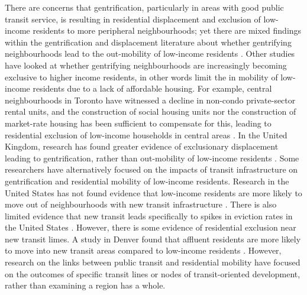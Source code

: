 There are concerns that gentrification, particularly in areas with good public transit service, is resulting in residential displacement and exclusion of low-income residents to more peripheral neighbourhoods; yet there are mixed findings within the gentrification and displacement literature about whether gentrifying neighbourhoods lead to the out-mobility of low-income residents \cite{freeman_displacement_2005,ellen_how_2011,mckinnish_who_2010,ding_gentrification_2016}. Other studies have looked at whether gentrifying neighbourhoods are increasingly becoming exclusive to higher income residents, in other words limit the in mobility of low-income residents due to a lack of affordable housing. For example, central neighbourhoods in Toronto have witnessed a decline in non-condo private-sector rental units, and the construction of social housing units nor the construction of market-rate housing has been sufficient to compensate for this, leading to residential exclusion of low-income households in central areas \cite{walks_gentrification_2021}. In the United Kingdom, research has found greater evidence of exclusionary displacement leading to gentrification, rather than out-mobility of low-income residents \cite{fransham_neighbourhood_2020}. Some researchers have alternatively focused on the impacts of transit infrastructure on gentrification and residential mobility of low-income residents. Research in the United States has not found evidence that low-income residents are more likely to move out of neighbourhoods with new transit infrastructure \cite{delmelle_new_2020}. There is also limited evidence that new transit leads specifically to spikes in eviction rates in the United States \cite{delmelle_investigating_2021}. However, there is some evidence of residential exclusion near new transit limes. A study in Denver found that affluent residents are more likely to move into new transit areas compared to low-income residents \cite{luckey_residential_2018}. However, research on the links between public transit and residential mobility have focused on the outcomes of specific transit lines or nodes of transit-oriented development, rather than examining a region has a whole.

